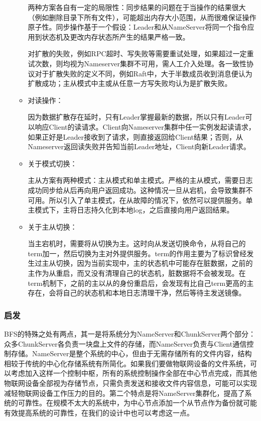 \documentclass{ctexart}
\begin{document}
\begin{enumerate}
\begin{itemize}
		两种方案各自有一定的局限性：同步结果的问题在于当操作的结果很大（例如删除目录下所有文件），可能超出内存大小范围，从而很难保证操作原子性。同步操作基于一个假设：Leader和从NameServer将同一个指令应用到状态机及更改内存状态所产生的结果严格一致。
		
		对扩散的失败，例如RPC超时、写失败等需要重试处理，如果超过一定重试次数，则均视为Nameserver集群不可用，需人工介入处理。各一致性协议对于扩散失败的定义不同，例如Raft中，大于半数成员收到消息便认为扩散成功；主从模式中主或从任意一方写失败均认为是扩散失败。
		\item 对读操作：
		
		因为数据扩散存在延时，只有Leader掌握最新的数据，所以只有Leader可以响应Client的读请求。Client向Nameserver集群中任一实例发起读请求，如果正好是Leader接收到了请求，则直接返回给Client结果；否则，从Nameserver返回读失败并告知当前Leader地址，Client向新Leader请求。
		\item 关于模式切换：
		
		主从方案有两种模式：主从模式和单主模式。严格的主从模式，需要日志成功同步给从后再向用户返回成功。这种情况一旦从宕机，会导致集群不可用。所以引入了单主模式，在从故障的情况下，依然可以提供服务。单主模式下，主将日志持久化到本地log，之后直接向用户返回结果。
		\item 关于主从切换：
		
		当主宕机时，需要将从切换为主。这时向从发送切换命令，从将自己的term加一，然后切换为主对外提供服务。term的作用主要为了标识曾经发生过主从切换，因为当前实现中，主的状态机中可能存在脏数据，之前的主作为从重启，而又没有清理自己的状态机，脏数据将不会被发现。在term机制下，之前的主以从的身份重启后，会发现有比自己term更高的主存在，会将自己的状态机和本地日志清理干净，然后等待主发送镜像。
	\end{itemize}
\end{enumerate}
\subsubsection{启发}
BFS的特殊之处有两点，其一是将系统分为NameServer和ChunkServer两个部分：众多ChunkServer各负责一块盘上文件的存储，而NameServer负责与Client通信控制存储。NameServer是整个系统的中心，但由于无需存储所有的文件内容，结构相较于传统的中心化存储系统有所简化。如果我们要做物联网设备的文件系统，可以考虑加入这样一个控制中枢，所有的系统控制操作全部在中心节点完成，而其他物联网设备全部视为存储节点，只需负责发送和接收文件内容信息，可能可以实现减轻物联网设备工作压力的目的。第二个特点是将NameServer集群化，提高了系统的可靠性。在规模不太大的系统中，为中心节点添加一个从节点作为备份就可能有效提高系统的可靠性，在我们的设计中也可以考虑这一点。
\end{document}
